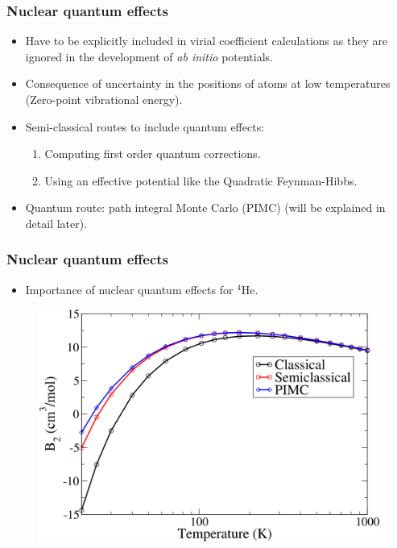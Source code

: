 \documentclass[xcolor=svgnames]{beamer}
\DeclareRobustCommand{\abinitio}[0]{\emph{ab initio}}
\begin{document}
        \begin{frame}
            \frametitle{Nuclear quantum effects}
            \begin{itemize}
                \justifying
                \item Have to be explicitly included in virial coefficient calculations as they are ignored in the development of \abinitio{} potentials.
                \item Consequence of uncertainty in the positions of atoms at low temperatures (Zero-point vibrational energy).
                \item Semi-classical routes to include quantum effects:
                    \begin{enumerate}
                        \item Computing first order quantum corrections.
                        \item Using an effective potential like the Quadratic Feynman-Hibbs.
                    \end{enumerate}
                \item Quantum route: path integral Monte Carlo (PIMC) (will be explained in detail later).
            \end{itemize}
        \end{frame}
        \begin{frame}
            \frametitle{Nuclear quantum effects}
            \begin{itemize}
                \item Importance of nuclear quantum effects for $^4$He.
            \end{itemize}
            \begin{figure}
            \centering
            \includegraphics[scale=0.17,keepaspectratio]{B2-Kate.png}
            \end{figure}
        \end{frame}
	
\end{document}
